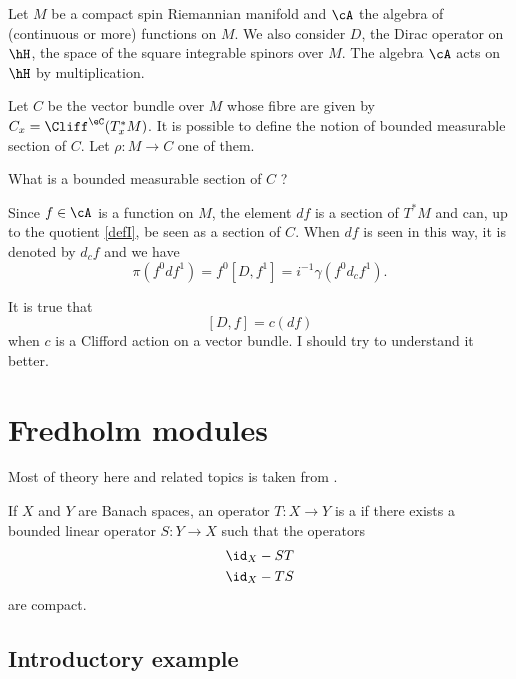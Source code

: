 Let $M$ be a compact spin Riemannian manifold and $\cA$ the algebra of (continuous or more) functions on $M$. We also consider $D$, the Dirac operator on $\hH$, the space of the square integrable spinors over $M$. The algebra $\cA$ acts on $\hH$ by multiplication.

Let $C$ be the vector bundle over $M$ whose fibre are given by $C_x=\Cliff^{\eC}(T^*_xM)$. It is possible to define the notion of bounded measurable section of $C$. Let $\rho\colon M\to C$ one of them.

\begin{probleme}
	What is a bounded measurable section of $C$ ?
\end{probleme}

Since $f\in\cA$ is a function on $M$, the element $df$ is a section of $T^*M$ and can, up to the quotient \eqref{defI}, be seen as a section of $C$. When $df$ is seen in this way, it is denoted by $d_cf$ and we have
\[ 
  \pi(f^0df^1)=f^0[D,f^1]=i^{-1}\gamma(f^0d_cf^1).
\]

\begin{probleme}
It is true that
\[ 
  [D,f]=c(df)
\]
when $c$ is a Clifford action on a vector bundle. I should try to understand it better.
\end{probleme}


\section{Fredholm modules}

Most of theory here and related topics is taken from \cite{ConnesNCG,Landi}.

If $X$ and $Y$ are Banach spaces, an operator $T\colon X\to Y$ is a  if there exists a bounded linear operator $S\colon Y\to X$ such that the operators
\begin{subequations}
	\begin{align}
		\id_X-ST\\
		\id_X-TS
	\end{align}
\end{subequations}
are compact.

\subsection{Introductory example}

